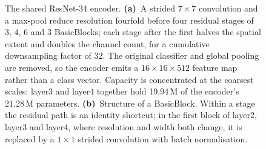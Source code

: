 \begin{figure}[t]
{}
\caption{The shared ResNet-34 encoder. \textbf{(a)}~A strided $7{\times}7$ convolution and a
max-pool reduce resolution fourfold before four residual stages of 3, 4, 6 and 3 BasicBlocks;
each stage after the first halves the spatial extent and doubles the channel count, for a
cumulative downsampling factor of 32. The original classifier and global pooling are removed, so
the encoder emits a $16{\times}16{\times}512$ feature map rather than a class vector. Capacity is
concentrated at the coarsest scales: layer3 and layer4 together hold 19.94\,M of the encoder's
21.28\,M parameters. \textbf{(b)}~Structure of a BasicBlock. Within a stage the residual path is
an identity shortcut; in the first block of layer2, layer3 and layer4, where resolution and width
both change, it is replaced by a $1{\times}1$ strided convolution with batch
normalisation.}\label{fig:encoder}
\end{figure}
